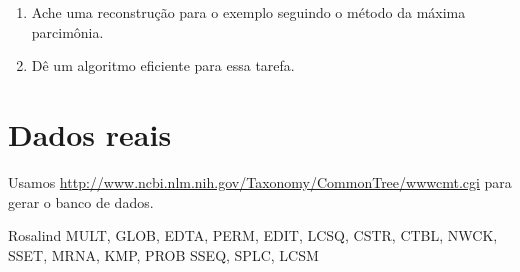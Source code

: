 \documentclass[11pt]{article}
\begin{document}
\begin{enumerate}
\item Ache uma reconstrução para o exemplo seguindo o método da
máxima parcimônia.
\item Dê um algoritmo eficiente para essa tarefa.
\end{enumerate}


\section{Dados reais}
\label{sec-2}

Usamos \url{http://www.ncbi.nlm.nih.gov/Taxonomy/CommonTree/wwwcmt.cgi} para gerar o banco de dados.

Rosalind MULT, GLOB, EDTA, PERM, EDIT, LCSQ,
CSTR, CTBL, NWCK, SSET, MRNA, KMP, PROB
SSEQ, SPLC, LCSM
\end{document}
